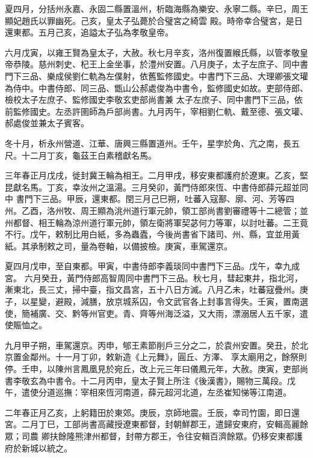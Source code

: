 \begin{pinyinscope}
 夏四月，分括州永嘉、永固二縣置溫州，析臨海縣為樂安、永寧二縣。辛巳，周王顯妃趙氏以罪幽死。己亥，皇太子弘薨於合璧宮之綺雲
 殿。時帝幸合璧宮，是日還東都。五月己亥，追謚太子弘為孝敬皇帝。



 六月戊寅，以雍王賢為皇太子，大赦。秋七月辛亥，洛州復置緱氏縣，以管孝敬皇帝恭陵。慈州刺史、杞王上金坐事，於澧州安置。八月庚子，太子左庶子、同中書門下三品、樂成侯劉仁軌為左僕射，依舊監修國史。中書門下三品、大理卿張文瓘為侍中。中書侍郎、同三品、甑山公郝處俊為中書令，監修國史如故。吏部侍郎、檢校太子左庶子、監修國史李敬玄吏部尚書兼
 太子左庶子、同中書門下三品，依前監修國史。左丞許圉師為戶部尚書。九月丙午，宰相劉仁軌、戴至德、張文瓘、郝處俊並兼太子賓客。



 冬十月，析永州營道、江華、唐興三縣置道州。壬午，星孛於角、亢之南，長五尺。十二月丁亥，龜茲王白素稽獻名馬。



 三年春正月戊戌，徙封冀王輪為相王。二月甲戌，移安東都護府於遼東。乙亥，堅昆獻名馬。丁亥，幸汝州之溫湯。三月癸卯，黃門侍郎來恆、中書侍郎薛元超並同中
 書門下三品。甲辰，還東都。閏三月己巳朔，吐蕃入寇鄯、廓、河、芳等四州。乙酉，洛州牧、周王顯為洮州道行軍元帥，領工部尚書劉審禮等十二總管；並州都督、相王輪為涼州道行軍元帥，領左衛將軍契苾何力等軍，以討吐蕃。二王竟不行。戊午，敕制比用白紙，多為蟲蠹，今後尚書省下諸司、州、縣，宜並用黃紙。其承制敕之司，量為卷軸，以備披檢。庚寅，車駕還京。



 夏四月戊申，至自東都。甲寅，中書侍郎李義琰同中書門下三品。戊午，幸九成宮。
 六月癸丑，黃門侍郎高智周同中書門下三品。秋七月，彗起東井，指北河，漸東北，長三丈，掃中臺，指文昌宮，五十八日方滅。八月乙未，吐蕃寇疊州。庚子，以星變，避殿，減膳，放京城系囚，令文武官各上封事言得失。壬寅，置南選使，簡補廣、交、黔等州官吏。青、齊等州海泛溢，又大雨，漂溺居人五千家，遣使賑恤之。



 九月甲子朔，車駕還京。丙申，郇王素節削戶三分之二，於袁州安置。癸丑，於北京置金鄰州。十一月丁卯，敕新造《上元舞》，圓丘、方澤、
 享太廟用之，餘祭則停。壬申，以陳州言鳳凰見於宛丘，改上元三年曰儀鳳元年，大赦。庚寅，吏部尚書李敬玄為中書令。十二月丙申，皇太子賢上所注《後漢書》，賜物三萬段。戊午，遣使分道巡撫：宰相來恆河南道，薛元超河北道，左丞崔知悌等江南道。



 二年春正月乙亥，上躬籍田於東郊。庚辰，京師地震。壬辰，幸司竹園，即日還宮。二月丁巳，工部尚書高藏授遼東都督，封朝鮮郡王，遣歸安東府，安輯高麗餘眾；司農
 卿扶餘隆熊津州都督，封帶方郡王，令往安輯百濟餘眾。仍移安東都護府於新城以統之。




\end{pinyinscope}
